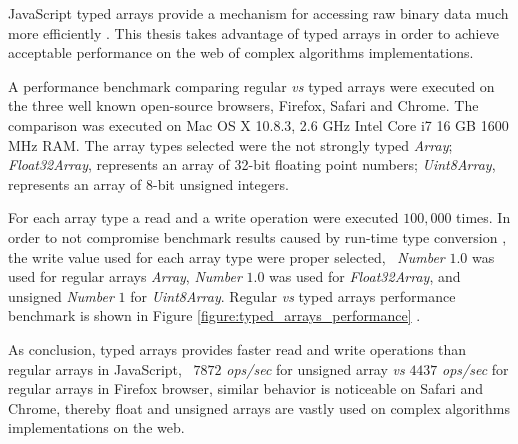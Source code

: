 JavaScript typed arrays provide a mechanism for accessing raw binary data much more efficiently \cite{MDN2013} \cite{TypedArray2013}. This thesis takes advantage of typed arrays in order to achieve acceptable performance on the web of complex algorithms implementations.

A performance benchmark comparing regular \textit{vs} typed arrays were executed on the three well known open-source browsers, Firefox, Safari and Chrome. The comparison was executed on Mac OS X 10.8.3, 2.6 GHz Intel Core i7 16 GB 1600 MHz RAM. The array types selected were the not strongly typed \textit{Array}; \textit{Float32Array}, represents an array of 32-bit floating point numbers; \textit{Uint8Array}, represents an array of 8-bit unsigned integers.

For each array type a read and a write operation were executed $100,000$ times. In order to not compromise benchmark results caused by run-time type conversion \cite{International2009}, the write value used for each array type were proper selected, \eg\ \textit{Number} $1.0$ was used for regular arrays \textit{Array}, \textit{Number} $1.0$ was used for \textit{Float32Array}, and unsigned \textit{Number} $1$ for \textit{Uint8Array}. Regular \textit{vs} typed arrays performance benchmark is shown in Figure \ref{figure:typed_arrays_performance} \cite{TypedArrayPerformance2013}.

As conclusion, typed arrays provides faster read and write operations than regular arrays in JavaScript, \ie\ $7872$ \textit{ops/sec} for unsigned array \textit{vs} $4437$ \textit{ops/sec} for regular arrays in Firefox browser, similar behavior is noticeable on Safari and Chrome, thereby float and unsigned arrays are vastly used on complex algorithms implementations on the web.

